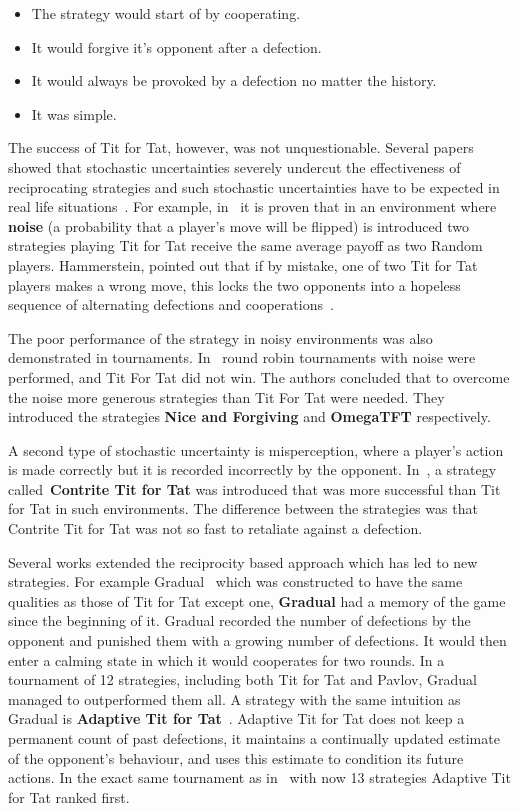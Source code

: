 \begin{itemize}
    \item The strategy would start of by cooperating.
    \item It would forgive it's opponent after a defection.
    \item It would always be provoked by a defection no matter the history.
    \item It was simple.
\end{itemize}

The success of Tit for Tat, however, was not unquestionable. Several papers
showed that stochastic uncertainties severely undercut the effectiveness of
reciprocating strategies and such stochastic uncertainties have to be expected
in real life situations~\cite{Milinski1987}. For example, in~\cite{Molander1985}
it is
proven that in an environment where \textbf{noise} (a probability that a
player's move will be flipped) is introduced two strategies playing Tit for Tat
receive the same average payoff as two Random players.
Hammerstein, pointed out that if by mistake, one of two
Tit for Tat players makes a wrong move, this locks the two opponents into a
hopeless sequence of alternating defections and cooperations~\cite{Hammerstein1984}.

The poor performance of the strategy in noisy environments was also demonstrated
in tournaments. In~\cite{Bendor1991, Donninger1986} round robin
tournaments with noise were performed, and Tit For Tat did not win.
The authors concluded that to overcome the noise more generous strategies
than Tit For Tat were needed. They introduced the strategies \textbf{Nice and Forgiving}
and \textbf{OmegaTFT} respectively.

A second type of stochastic uncertainty is
misperception, where a player's action is made correctly but it is recorded
incorrectly by the opponent. In~\cite{Wu1995}, a strategy
called~\textbf{Contrite Tit for Tat} was introduced that was more successful than Tit for Tat
in such environments. The difference between the strategies was that Contrite
Tit for Tat was not so fast to retaliate against a defection.

Several works extended the reciprocity based approach which has led to new
strategies. For example Gradual~\cite{Beaufils1997} which was constructed to
have the same qualities as those of Tit for Tat except one,
\textbf{Gradual} had a memory of the game since the beginning of it. Gradual
recorded the number of defections by the opponent and punished them with a
growing number of defections. It would then enter a calming state in which it
would cooperates for two rounds. In a tournament of 12 strategies, including
both Tit for Tat and Pavlov, Gradual managed to outperformed them all. A
strategy with the same intuition as Gradual is \textbf{Adaptive Tit for
Tat}~\cite{tzafestas-2000a}. Adaptive Tit for Tat does not keep a permanent
count of past defections, it maintains a continually updated estimate of the
opponent’s behaviour, and uses this estimate to condition its future actions. In
the exact same tournament as in~\cite{Beaufils1997} with now 13 strategies Adaptive
Tit for Tat ranked first.

